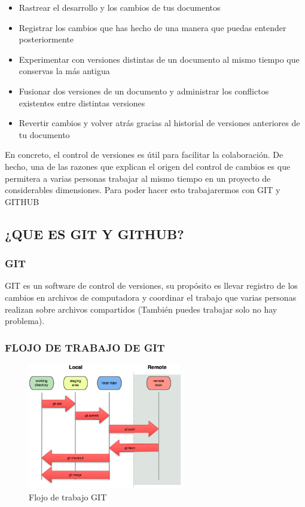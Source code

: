  \begin{itemize}
   \renewcommand{\labelitemi} {\textcolor{red}{$\bigstar$}}
  \item  Rastrear el desarrollo y los cambios de tus documentos
  \item Registrar los cambios que has hecho de una manera que puedas entender posteriormente
  \item Experimentar con versiones distintas de un documento al mismo tiempo que conservas la más antigua
  \item Fusionar dos versiones de un documento y administrar los conflictos existentes entre distintas versiones
  \item Revertir cambios y volver atrás gracias al historial de versiones anteriores de tu documento
 \end{itemize}

 En concreto, el control de versiones es útil para facilitar la colaboración. De hecho, una de las razones que explican el origen del control de cambios es que permitera a varias personas trabajar al mismo tiempo en un proyecto de considerables dimensiones. Para poder hacer esto trabajarermos con GIT y GITHUB\cite{strien_introduccion_2017}

\subsection{¿QUE ES GIT Y GITHUB?}
\subsubsection{GIT}
GIT es un software de control de versiones, su propósito es llevar registro de los cambios en archivos de computadora y coordinar el trabajo que varias personas realizan sobre archivos compartidos (También puedes trabajar solo no hay problema). \cite{noauthor_introduccion_nodate}

\subsubsection {FLOJO DE TRABAJO DE GIT}
 \begin{figure}[H]
    \centering
    \includegraphics[width=0.6\textwidth]{img/gitflujo.png}
    \caption{Flojo de trabajo GIT}
\end{figure}

